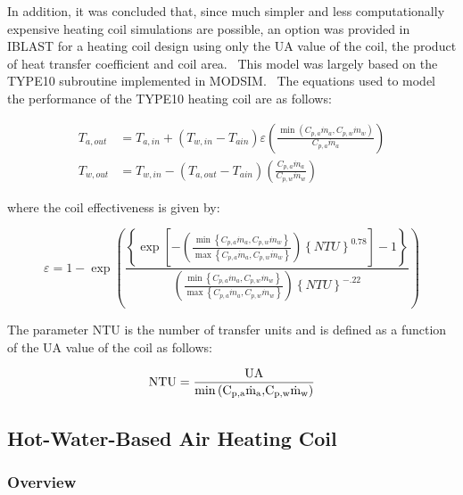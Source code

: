 In addition, it was concluded that, since much simpler and less computationally expensive heating coil simulations are possible, an option was provided in IBLAST for a heating coil design using only the UA value of the coil, the product of heat transfer coefficient and coil area.~ This model was largely based on the TYPE10 subroutine implemented in MODSIM.~ The equations used to model the performance of the TYPE10 heating coil are as follows:

\begin{equation}
  \begin{array}{rl} 
    T_{a,out} & = T_{a,in} + \left( T_{w,in} - T_{ain} \right) \varepsilon \left( \frac{\min \left( C_{p,a} \dot m_a,C_{p,w}\dot m_w \right)} {C_{p,a}\dot m_a} \right) \\
    T_{w,out} & = T_{w,in} - \left( T_{a,out} - T_{ain} \right) \left( \frac{C_{p,a}\dot m_a}{C_{p,w}\dot m_w} \right)
  \end{array}
\end{equation}

where the coil effectiveness is given by:

\begin{equation}
\varepsilon  = 1 - \exp \left( {\frac{{\left\{ {\exp \left[ { - \left( {\frac{{\min \left\{ {{C_{p,a}}{{\dot m}_a},{C_{p,w}}{{\dot m}_w}} \right\}}}{{\max \left\{ {{C_{p,a}}{{\dot m}_a},{C_{p,w}}{{\dot m}_w}} \right\}}}} \right){{\left\{ {NTU} \right\}}^{0.78}}} \right] - 1} \right\}}}{{\left( {\frac{{\min \left\{ {{C_{p,a}}{{\dot m}_a},{C_{p,w}}{{\dot m}_w}} \right\}}}{{\max \left\{ {{C_{p,a}}{{\dot m}_a},{C_{p,w}}{{\dot m}_w}} \right\}}}} \right){{\left\{ {NTU} \right\}}^{ - .22}}}}} \right)
\end{equation}

The parameter NTU is the number of transfer units and is defined as a function of the UA value of the coil as follows:

\begin{equation}
{\rm{NTU}} = \frac{{{\rm{UA}}}}{{{\rm{min}}\left( {{{\rm{C}}_{{\rm{p,a}}}}{{{\rm{\dot m}}}_{\rm{a}}}{\rm{,}}{{\rm{C}}_{{\rm{p,w}}}}{{{\rm{\dot m}}}_{\rm{w}}}} \right)}}
\end{equation}

\subsection{Hot-Water-Based Air Heating Coil}\label{hot-water-based-air-heating-coil}

\subsubsection{Overview}\label{overview-010}

